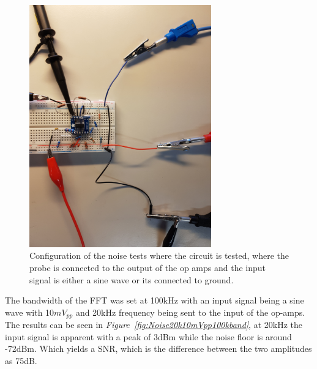 
\begin{figure}[h]
    \centering
    \includegraphics[width=0.7\textwidth]{graphics/TESTINGwSineinp.jpg}
    \caption{Configuration of the noise tests where the circuit is tested, where the probe is connected to the output of the op amps and the input signal is either a sine wave or its connected to ground.}
    \label{fig:SetupFFT}
\end{figure}


The bandwidth of the FFT was set at 100kHz with an input signal being a sine wave with 10$mV_{pp}$ and 20kHz frequency being sent to the input of the op-amps.
The results can be seen in \textit{Figure~\ref{fig:Noise20k10mVpp100kband}}, at 20kHz the input signal is apparent with a peak of 3dBm while the noise floor is around -72dBm.
Which yields a SNR, which is the difference between the two amplitudes as 75dB.

\clearpage

